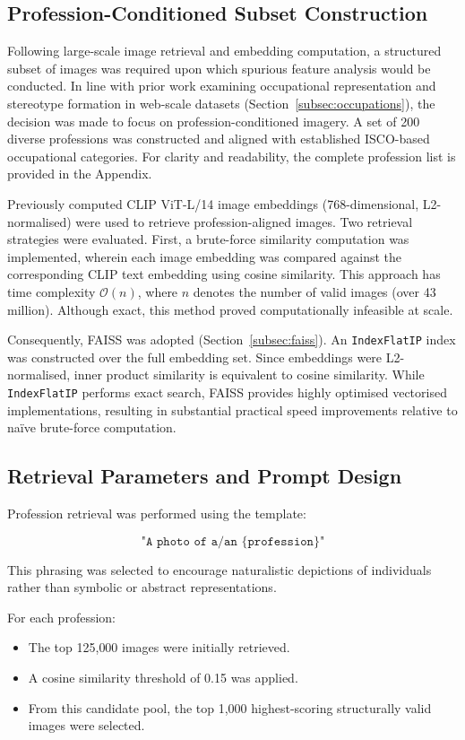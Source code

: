 \subsection{Profession-Conditioned Subset Construction}

Following large-scale image retrieval and embedding computation, a structured subset of images was required upon which spurious feature analysis would be conducted. In line with prior work examining occupational representation and stereotype formation in web-scale datasets (Section~\ref{subsec:occupations}), the decision was made to focus on profession-conditioned imagery. A set of 200 diverse professions was constructed and aligned with established ISCO-based occupational categories. For clarity and readability, the complete profession list is provided in the Appendix.

Previously computed CLIP ViT-L/14 image embeddings (768-dimensional, L2-normalised) were used to retrieve profession-aligned images. Two retrieval strategies were evaluated. First, a brute-force similarity computation was implemented, wherein each image embedding was compared against the corresponding CLIP text embedding using cosine similarity. This approach has time complexity $\mathcal{O}(n)$, where $n$ denotes the number of valid images (over 43 million). Although exact, this method proved computationally infeasible at scale.

Consequently, FAISS was adopted (Section~\ref{subsec:faiss}). An \texttt{IndexFlatIP} index was constructed over the full embedding set. Since embeddings were L2-normalised, inner product similarity is equivalent to cosine similarity. While \texttt{IndexFlatIP} performs exact search, FAISS provides highly optimised vectorised implementations, resulting in substantial practical speed improvements relative to naïve brute-force computation.

\subsection{Retrieval Parameters and Prompt Design}

Profession retrieval was performed using the template:

\[
\texttt{"A photo of a/an \{profession\}"}
\]

This phrasing was selected to encourage naturalistic depictions of individuals rather than symbolic or abstract representations.

For each profession:
\begin{itemize}
	\item The top 125{,}000 images were initially retrieved.
	\item A cosine similarity threshold of 0.15 was applied.
	\item From this candidate pool, the top 1{,}000 highest-scoring structurally valid images were selected.
\end{itemize}

